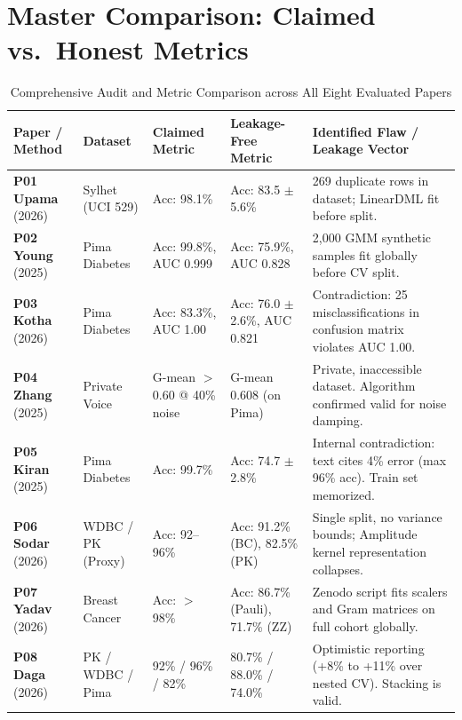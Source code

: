 \documentclass[11pt,a4paper]{article}
\begin{document}
\section{Master Comparison: Claimed vs.\ Honest Metrics}
\begin{table}[h!]
\centering
\small
\caption{Comprehensive Audit and Metric Comparison across All Eight Evaluated Papers}
\begin{tabular}{p{2.6cm}p{2.3cm}p{2.5cm}p{2.5cm}p{4.8cm}}
\toprule
\textbf{Paper / Method} & \textbf{Dataset} & \textbf{Claimed Metric} & \textbf{Leakage-Free Metric} & \textbf{Identified Flaw / Leakage Vector} \\
\midrule
\textbf{P01 Upama} (2026) & Sylhet (UCI 529) & Acc: 98.1\% & Acc: 83.5 $\pm$ 5.6\% & 269 duplicate rows in dataset; LinearDML fit before split. \\
\textbf{P02 Young} (2025) & Pima Diabetes & Acc: 99.8\%, AUC 0.999 & Acc: 75.9\%, AUC 0.828 & 2,000 GMM synthetic samples fit globally before CV split. \\
\textbf{P03 Kotha} (2026) & Pima Diabetes & Acc: 83.3\%, AUC 1.00 & Acc: 76.0 $\pm$ 2.6\%, AUC 0.821 & Contradiction: 25 misclassifications in confusion matrix violates AUC 1.00. \\
\textbf{P04 Zhang} (2025) & Private Voice & G-mean $>$0.60 @ 40\% noise & G-mean 0.608 (on Pima) & Private, inaccessible dataset. Algorithm confirmed valid for noise damping. \\
\textbf{P05 Kiran} (2025) & Pima Diabetes & Acc: 99.7\% & Acc: 74.7 $\pm$ 2.8\% & Internal contradiction: text cites 4\% error (max 96\% acc). Train set memorized. \\
\textbf{P06 Sodar} (2026) & WDBC / PK (Proxy) & Acc: 92--96\% & Acc: 91.2\% (BC), 82.5\% (PK) & Single split, no variance bounds; Amplitude kernel representation collapses. \\
\textbf{P07 Yadav} (2026) & Breast Cancer & Acc: $>$98\% & Acc: 86.7\% (Pauli), 71.7\% (ZZ) & Zenodo script fits scalers and Gram matrices on full cohort globally. \\
\textbf{P08 Daga} (2026) & PK / WDBC / Pima & 92\% / 96\% / 82\% & 80.7\% / 88.0\% / 74.0\% & Optimistic reporting (+8\% to +11\% over nested CV). Stacking is valid. \\
\bottomrule
\end{tabular}
\end{table}

\end{document}
